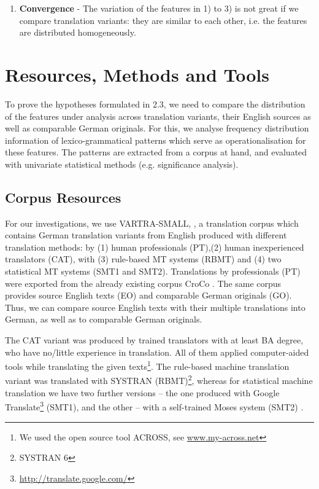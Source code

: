 \documentclass[output=paper]{LSP/langsci}
\begin{document}
\begin{enumerate}
\item \textbf{Convergence} - The variation of the features in 1) to 3) is not great if we compare translation variants: they are similar to each other, i.e. the features are distributed homogeneously.
\end{enumerate}

\section{Resources, Methods and Tools}

To prove the hypotheses formulated in 2.3, we need to compare the distribution of the features under analysis across translation variants, their English sources as well as comparable German originals. For this, we analyse frequency distribution information of lexico-grammatical patterns which serve as operationalisation for these features. The patterns are extracted from a corpus at hand, and evaluated with univariate statistical methods (e.g. significance analysis).

\subsection{Corpus Resources}
For our investigations, we use VARTRA-SMALL, \citep[see][]{Lapshinova2013}, a translation corpus which contains German translation variants from English produced with different translation methods: by (1) human professionals (PT),(2) human inexperienced translators (CAT), with (3) rule-based MT systems (RBMT) and (4) two statistical MT systems (SMT1 and SMT2). Translations by professionals (PT) were exported from the already existing corpus CroCo \citep{HansenSchirra2013}. The same corpus provides source English texts (EO) and comparable German originals (GO). Thus, we can compare source English texts with their multiple translations into German, as well as to comparable German originals.

The CAT variant was produced by trained translators with at least BA degree, who have no/little experience in translation. All of them applied computer-aided tools while translating the given texts\footnote{We used the open source tool ACROSS, see \url{www.my-across.net}}. The rule-based machine translation variant was translated with SYSTRAN (RBMT)\footnote{SYSTRAN 6}, whereas for statistical machine translation we have two further versions – the one produced with Google Translate\footnote{\url{http://translate.google.com/}} (SMT1), and the other – with a self-trained Moses system (SMT2) \citep[see][]{Hoang2007}.
\end{document}
